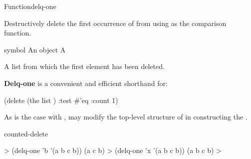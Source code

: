 \documentclass[10pt,twoside,english,pdftex]{article}
\begin{document}

\begin{functiondoc}{Function}{delq-one}{
    }
%
  
\fnsyntax

\fnpurpose Destructively delete the first occurrence of 
from  using  as the comparison function.

\fnpackage {}

\fnmodule {}

\fnargs
\begin{args}{symbol}
\arg[item] An object
\arg[list] A 
\end{args}

\fnreturns A list from which the first  element has been deleted.

\fndescription \textbf{Delq-one} is a convenient and efficient shorthand for:
%
\W\supp
\begin{example}
  (delete  (the list ) :test #'eq :count 1)
\end{example}
%
As is the case with ,  may modify
the top-level structure of  in constructing the
.

\begin{alsos}{counted-delete}
\also[delq]
\end{alsos}

\fnexamples
\W\supp
\begin{example}
  > (delq-one 'b '(a b c b))
  (a c b)
  > (delq-one 'x '(a b c b))
  (a b c b)
  >
\end{example}

\end{functiondoc}

\end{document}
